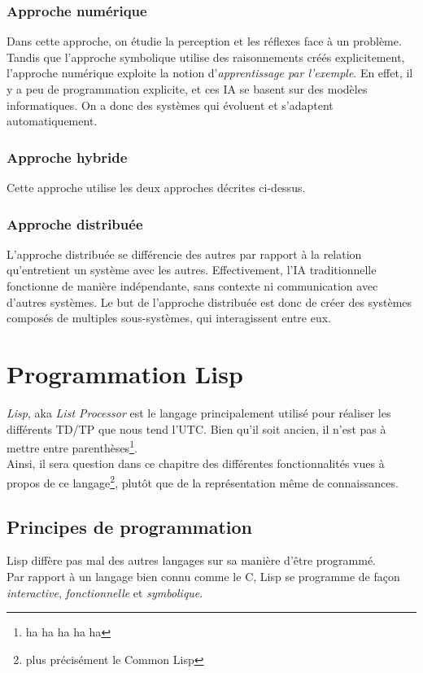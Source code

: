 \documentclass{report}
\begin{document}
\subsection{Approche numérique}
Dans cette approche, on étudie la perception et les réflexes face à un problème.
Tandis que l'approche symbolique utilise des raisonnements créés explicitement, l'approche numérique exploite la notion d'\emph{apprentissage par l'exemple}.
En effet, il y a peu de programmation explicite, et ces IA se basent sur des modèles informatiques.
On a donc des systèmes qui évoluent et s'adaptent automatiquement.
\subsection{Approche hybride}
Cette approche utilise les deux approches décrites ci-dessus.
\subsection{Approche distribuée}
L'approche distribuée se différencie des autres par rapport à la relation qu'entretient un système avec les autres.
Effectivement, l'IA traditionnelle fonctionne de manière indépendante, sans contexte ni communication avec d'autres systèmes.
Le but de l'approche distribuée est donc de créer des systèmes composés de multiples sous-systèmes, qui interagissent entre eux.


\chapter{Programmation Lisp}
\emph{Lisp}, aka \emph{List Processor} est le langage principalement utilisé pour réaliser les différents TD/TP que nous tend l'UTC.
Bien qu'il soit ancien, il n'est pas à mettre entre parenthèses\footnote{ha ha ha ha ha}.\\
Ainsi, il sera question dans ce chapitre des différentes fonctionnalités vues à propos de ce langage\footnote{plus précisément le Common Lisp}, plutôt que de la représentation même de connaissances.

\section{Principes de programmation}
Lisp diffère pas mal des autres langages sur sa manière d'être programmé.\\
Par rapport à un langage bien connu comme le C, Lisp se programme de façon \emph{interactive}, \emph{fonctionnelle} et \emph{symbolique}.
\end{document}
